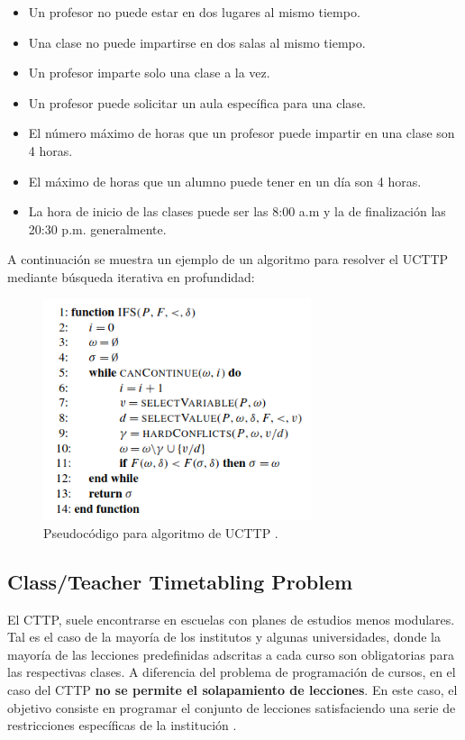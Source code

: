 \begin{itemize}
    \item Un profesor no puede estar en dos lugares al mismo tiempo.
    \item Una clase no puede impartirse en dos salas al mismo tiempo.
    \item Un profesor imparte solo una clase a la vez.
    \item Un profesor puede solicitar un aula específica para una clase.
    \item El número máximo de horas que un profesor puede impartir en una clase son 4 horas.
    \item El máximo de horas que un alumno puede tener en un día son 4 horas.
    \item La hora de inicio de las clases puede ser las 8:00 a.m y la de finalización las 20:30 p.m. generalmente.
\end{itemize}
A continuación se muestra un ejemplo de un algoritmo para resolver el UCTTP mediante búsqueda iterativa en profundidad:

\begin{figure}[H]
    \centering
    \includegraphics[width=0.7\textwidth]{./imagenes/UCTTP_Algoritmo.png}
    \caption{Pseudocódigo para algoritmo de UCTTP \cite{Rudova2011}.}
\end{figure}

\newpage

\subsection{Class/Teacher Timetabling Problem}

El CTTP, suele encontrarse en escuelas con planes de estudios menos modulares. Tal es el caso de la mayoría de los institutos y algunas universidades, donde la mayoría de las lecciones predefinidas adscritas a cada curso son obligatorias para las respectivas clases. A diferencia del problema de programación de cursos, en el caso del CTTP \textbf{no se permite el solapamiento de lecciones}. En este caso, el objetivo consiste en programar el conjunto de lecciones satisfaciendo una serie de restricciones específicas de la institución \cite{doi:10.1504/IJOR.2024.139234}.\newline

